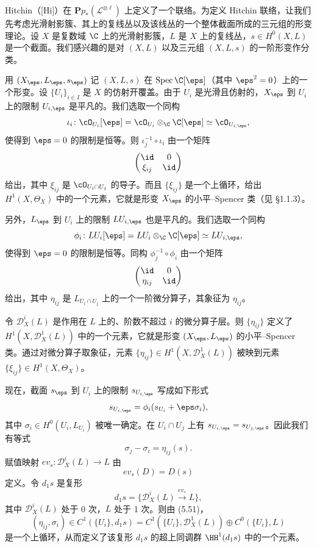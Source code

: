 Hitchin（[Hi]）在 $\mathbf{P}p_*(\mathcal L^{\otimes\ell})$ 上定义了一个联络。为定义 Hitchin 联络，让我们先考虑光滑射影簇、其上的复线丛以及该线丛的一个整体截面所成的三元组的形变理论。设 $X$ 是复数域 $\C$ 上的光滑射影簇，$L$ 是 $X$ 上的复线丛，$s\in H^0(X,L)$ 是一个截面。我们感兴趣的是对 $(X,L)$ 以及三元组 $(X,L,s)$ 的一阶形变作分类。

用 $(X_\eps,L_\eps,s_\eps)$ 记 $(X,L,s)$ 在 $\operatorname{Spec}\C[\eps]$（其中 $\eps^2=0$）上的一个形变。设 $\{U_i\}_{i\in I}$ 是 $X$ 的仿射开覆盖。由于 $U_i$ 是光滑且仿射的，$X_\eps$ 到 $U_i$ 上的限制 $U_{i,\eps}$ 是平凡的。我们选取一个同构
\[
 \iota_i\colon\cO_{U_i}[\eps]=\cO_{U_i}\otimes_\C\C[\eps]\simeq\cO_{U_{i,\eps}},
\]
使得到 $\eps=0$ 的限制是恒等。则 $\iota_j^{-1}\circ\iota_i$ 由一个矩阵
\[
 \begin{pmatrix} \id & 0\\ \xi_{ij} & \id \end{pmatrix}
\]
给出，其中 $\xi_{ij}$ 是 $\cO_{U_i\cap U_j}$ 的导子。而且 $\{\xi_{ij}\}$ 是一个上循环，给出 $H^1(X,\Theta_X)$ 中的一个元素，它就是形变 $X_\eps$ 的小平–Spencer 类（见 §1.1.3）。


另外，$L_\eps$ 到 $U_i$ 上的限制 $LU_{i,\eps}$ 也是平凡的。我们选取一个同构
\[
 \phi_i\colon LU_i[\eps]=LU_i\otimes_\C\C[\eps]\simeq LU_{i,\eps},
\]
使得到 $\eps=0$ 的限制是恒等。同构 $\phi_j^{-1}\circ\phi_i$ 由一个矩阵
\[
 \begin{pmatrix} \id & 0\\ \eta_{ij} & \id \end{pmatrix}
\]
给出，其中 $\eta_{ij}$ 是 $L_{U_i\cap U_j}$ 上的一个一阶微分算子，其象征为 $\eta_{ij}$。


令 $\mathcal D_X^i(L)$ 是作用在 $L$ 上的、阶数不超过 $i$ 的微分算子层。则 $\{\eta_{ij}\}$ 定义了 $H^1(X,\mathcal D_X^1(L))$ 中的一个元素，它就是形变 $(X_\eps,L_\eps)$ 的小平–Spencer 类。通过对微分算子取象征，元素 $\{\eta_{ij}\}\in H^1(X,\mathcal D_X^1(L))$ 被映到元素 $\{\xi_{ij}\}\in H^1(X,\Theta_X)$。

现在，截面 $s_\eps$ 到 $U_i$ 上的限制 $s_{U_{i,\eps}}$ 写成如下形式
\[
 s_{U_{i,\eps}}=\phi_i(s_{U_i}+\eps\sigma_i),
\]
其中 $\sigma_i\in H^0(U_i,L_{U_i})$ 被唯一确定。在 $U_i\cap U_j$ 上有 $s_{U_{i,\eps}}=s_{U_{j,\eps}}$。因此我们有等式
\begin{equation}
 \sigma_j-\sigma_i=\eta_{ij}(s). \tag{5.51}
\end{equation}
赋值映射 $ev_s\colon\mathcal D_X^i(L)\to L$ 由
\[
 ev_s(D)=D(s)
\]
定义。令 $d_1s$ 是复形
\[
 d_1s=\{\mathcal D_X^i(L)\xrightarrow{ev_s}L\},
\]
其中 $\mathcal D_X^i(L)$ 处于 0 次，$L$ 处于 1 次。则由 (5.51)，
\[
 (\eta_{ij},\sigma_i)\in C^1(\{U_i\},d_1s)=C^1(\{U_i\},\mathcal D_X^1(L))\oplus C^0(\{U_i\},L)
\]
是一个上循环，从而定义了该复形 $d_1s$ 的超上同调群 $\HH^1(d_1s)$ 中的一个元素。

